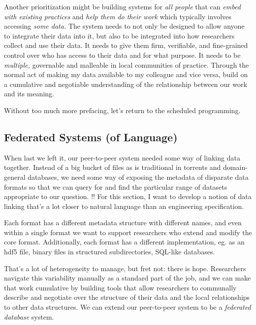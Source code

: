 \documentclass[notoc]{tufte-book}
\begin{document}
Another prioritization might be building systems for \emph{all people}
that can \emph{embed with existing practices} and \emph{help them do
their work} which typically involves accessing \emph{some data.} The
system needs to not only be designed to allow anyone to integrate their
data into it, but also to be integrated into how researchers collect and
use their data. It needs to give them firm, verifiable, and fine-grained
control over who has access to their data and for what purpose. It needs
to be \emph{multiple,} governable and malleable in local communities of
practice. Through the normal act of making my data available to my
colleague and vice versa, build on a cumulative and negotiable
understanding of the relationship between our work and its meaning.

Without too much more prefacing, let's return to the scheduled
programming. 




\subsection{Federated Systems (of
Language)}



 When last we left it, our peer-to-peer system needed some
way of linking data together. Instead of a big bucket of files as is
traditional in torrents and domain-general databases, we need some way
of exposing the metadata of disparate data formats so that we can query
for and find the particular range of datasets appropriate to our
question. !! For this section, I want to develop a notion of data
linking that's a lot closer to natural language than an engineering
specification.

Each format has a different metadata structure with different names, and
even within a single format we want to support researchers who extend
and modify the core format. Additionally, each format has a different
implementation, eg. as an hdf5 file, binary files in structured
subdirectories, SQL-like databases.

That's a lot of heterogeneity to manage, but fret not: there is hope.
Researchers navigate this variability manually as a standard part of the
job, and we can make that work cumulative by building tools that allow
researchers to communally describe and negotiate over the structure of
their data and the local relationships to other data structures. We can
extend our peer-to-peer system to be a \emph{federated database} system.
\end{document}

